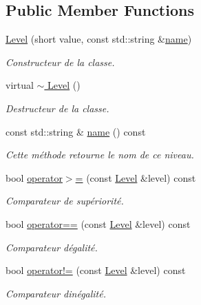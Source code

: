 \subsection*{Public Member Functions}
\begin{DoxyCompactItemize}
\item 
\hyperlink{classlogs_1_1Level_af6c5f7e1d4de11ee1df98d5d45eb642f}{Level} (short value, const std\+::string \&\hyperlink{classlogs_1_1Level_a068733ab7f581994ab9e2e9359a4434d}{name})
\begin{DoxyCompactList}\small\item\em Constructeur de la classe. \end{DoxyCompactList}\item 
\mbox{\label{classlogs_1_1Level_a099a5c2ede10f6b78eb22967eca10b2d}} 
virtual \hyperlink{classlogs_1_1Level_a099a5c2ede10f6b78eb22967eca10b2d}{$\sim$ Level} ()
\begin{DoxyCompactList}\small\item\em Destructeur de la classe. \end{DoxyCompactList}\item 
const std\+::string \& \hyperlink{classlogs_1_1Level_a068733ab7f581994ab9e2e9359a4434d}{name} () const
\begin{DoxyCompactList}\small\item\em Cette méthode retourne le nom de ce niveau. \end{DoxyCompactList}\item 
bool \hyperlink{classlogs_1_1Level_a30e7fbe5b2694e90c9f938c9aecd253b}{operator$>$=} (const \hyperlink{classlogs_1_1Level}{Level} \&level) const
\begin{DoxyCompactList}\small\item\em Comparateur de supériorité. \end{DoxyCompactList}\item 
bool \hyperlink{classlogs_1_1Level_a52add2597d2596d6114d1e395faeee0f}{operator==} (const \hyperlink{classlogs_1_1Level}{Level} \&level) const
\begin{DoxyCompactList}\small\item\em Comparateur d\textquotesingle{}égalité. \end{DoxyCompactList}\item 
bool \hyperlink{classlogs_1_1Level_a771a678978db8aec749e6d93491b1898}{operator!=} (const \hyperlink{classlogs_1_1Level}{Level} \&level) const
\begin{DoxyCompactList}\small\item\em Comparateur d\textquotesingle{}inégalité. \end{DoxyCompactList}\end{DoxyCompactItemize}
